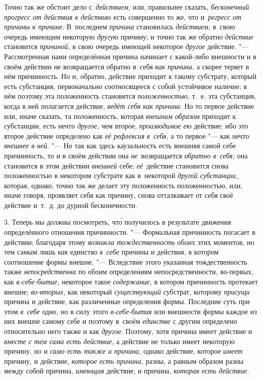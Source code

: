 Точно так же обстоит дело с~{\em действием;} или, правильнее сказать,
{\em бесконечный прогресс от действия к действию} есть совершенно то же, что
и~{\em регресс от причины к причине}. В~последнем {\em причина} становилась
{\em действием,} в~свою очередь имеющим некоторую {\em другую} причину; и точно
так же обратно {\em действие} становится {\em причиной,} в свою очередь имеющей
некоторое {\em другое} действие. "--- Рассмотренная нами определённая причина
начинает с какой-либо внешности и в своём действии не возвращается обратно
в~себя {\em как причина,} а скорее теряет в нём причинность. Но и, обратно,
действие приходит к такому субстрату, который есть субстанция, первоначально
соотносящееся с собой устойчивое наличие; в нём поэтому эта положенность
становится {\em положенностью,} т.~е. эта субстанция, когда в ней полагается
действие, {\em ведёт себя как причина}. Но то первое действие или, иначе
сказать, та положенность, которая {\em внешним образом} приходит к субстанции,
есть нечто {\em другое,} чем второе, {\em производимое ею} действие; ибо это
второе действие определено как {\em её рефлексия} {\em в~себя,} а то первое
"--- как нечто {\em внешнее в ней}. "--- Но так как здесь каузальность есть
внешняя самой себе причинность, то и в своём действии она {\em не}~возвращается
{\em обратно в~себя;} она становится в этом действии {\em внешней} себе;
{\em её}~действие становится снова положенностью в некотором субстрате как
в~некоторой {\em другой субстанции,} которая, однако, точно так же делает эту
положенность положенностью, или, иначе говоря, проявляет себя как причину,
снова отталкивает от себя своё действие и~т.~д. до дурной бесконечности.

3. Теперь мы должны посмотреть, чт\'{о} получилось в результате движения
определённого отношения причинности. "--- Формальная причинность погасает в
действии; благодаря этому {\em возникла тождественность} обоих этих моментов,
но тем самым лишь {\em как} единство {\em в~себе} причины и действия, в котором
соотношение формы внешне. "--- Вследствие этого указанная тождественность также
{\em непосредственна} по обоим определениям непосредственности, во-первых, как
{\em в-себе-бытие,} некоторое такое {\em содержание,} в котором причинность
протекает внешне; {\em во-вторых,} как некоторый {\em существующий} субстрат,
которому {\em присущи} причина и действие, как различенные определения формы.
Последние суть при этом {\em в~себе} одно, но в силу этого {\em в-себе-бытия}
или внешности формы каждое из них внешне самому себе и поэтому в~своём
{\em единстве} с другим определено относительно него также и как {\em другое}.
Поэтому, хотя причина имеет действие и {\em вместе с тем сама есть действие,}
а действие не только имеет некоторую причину, но и
{\em само есть также и причина,} однако действие, которое {\em имеет} причину,
и действие, {\em которое есть причина,} разны, а равным образом разны между
собой причина, {\em имеющая} действие, и причина, {\em которая есть действие}.

